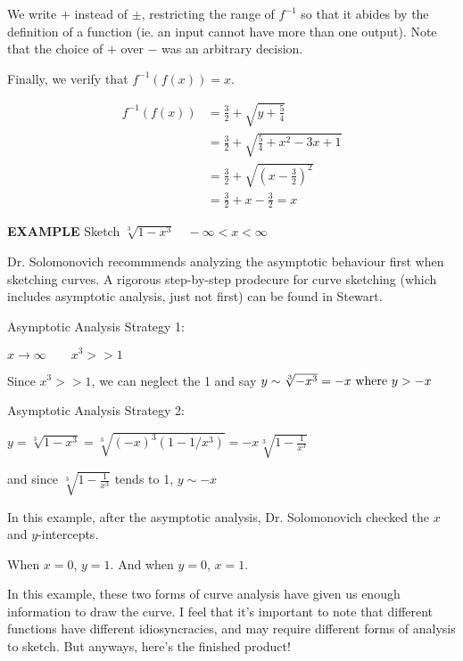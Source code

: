 \documentclass{article}
\begin{document}
We write $+$ instead of $\pm$, restricting the range of $f^{-1}$ so that it abides by the definition of a function (ie. an input cannot have more than one output). Note that the choice of $+$ over $-$ was an arbitrary decision.

\vspace{10pt}

Finally, we verify that $f^{-1}(f(x))=x$.

\begin{align*}
f^{-1}(f(x))&=\frac{3}{2}+\sqrt{y+\frac{5}{4}}\\
&=\frac{3}{2}+\sqrt{\frac{5}{4}+x^2-3x+1}\\
&=\frac{3}{2}+\sqrt{\left(x-\frac{3}{2}\right)^2}\\
&=\frac{3}{2}+x-\frac{3}{2}=x
\end{align*}

{\bf{}EXAMPLE} Sketch $\sqrt[3]{1-x^3}\quad-\infty<x<\infty$

\vspace{10pt}

Dr. Solomonovich recommmends analyzing the asymptotic behaviour first when sketching curves. A rigorous step-by-step prodecure for curve sketching (which includes asymptotic analysis, just not first) can be found in Stewart.

\vspace{10pt}

Asymptotic Analysis Strategy 1:

$x\to\infty\qquad x^3>>1$

Since $x^3>>1$, we can neglect the 1 and say $y\sim\sqrt[3]{-x^3}=-x\textnormal{ where }y>-x$

\vspace{10pt}

Asymptotic Analysis Strategy 2:

$y=\sqrt[3]{1-x^3}=\sqrt[3]{(-x)^3(1-1/x^3)}=-x\sqrt[3]{1-\frac{1}{x^3}}$

and since $\sqrt[3]{1-\frac{1}{x^3}}$ tends to 1, $y\sim-x$

\vspace{10pt}

In this example, after the asymptotic analysis, Dr. Solomonovich checked the $x$ and $y$-intercepts.

When $x=0$, $y=1$. And when $y=0$, $x=1$.

\vspace{10pt}

In this example, these two forms of curve analysis have given us enough information to draw the curve. I feel that it's important to note that different functions have different idiosyncracies, and may require different forms of analysis to sketch. But anyways, here's the finished product!
\end{document}

